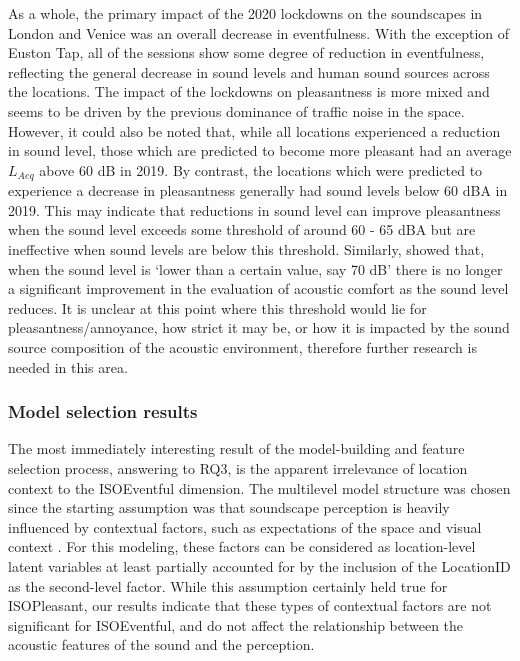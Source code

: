\documentclass[
  authoryear,
  preprint,
  3p,
  onecolumn]{elsarticle}
\begin{document}
As a whole, the primary impact of the 2020 lockdowns on the soundscapes
in London and Venice was an overall decrease in eventfulness. With the
exception of Euston Tap, all of the sessions show some degree of
reduction in eventfulness, reflecting the general decrease in sound
levels and human sound sources across the locations. The impact of the
lockdowns on pleasantness is more mixed and seems to be driven by the
previous dominance of traffic noise in the space. However, it could also
be noted that, while all locations experienced a reduction in sound
level, those which are predicted to become more pleasant had an average
\(L_{Aeq}\) above 60 dB in 2019. By contrast, the locations which were
predicted to experience a decrease in pleasantness generally had sound
levels below 60 dBA in 2019. This may indicate that reductions in sound
level can improve pleasantness when the sound level exceeds some
threshold of around 60 - 65 dBA but are ineffective when sound levels
are below this threshold. Similarly, \citet{Yang2005Acoustic} showed
that, when the sound level is `lower than a certain value, say 70 dB'
there is no longer a significant improvement in the evaluation of
acoustic comfort as the sound level reduces. It is unclear at this point
where this threshold would lie for pleasantness/annoyance, how strict it
may be, or how it is impacted by the sound source composition of the
acoustic environment, therefore further research is needed in this area.

\subsubsection{Model selection results}\label{model-selection-results}

The most immediately interesting result of the model-building and
feature selection process, answering to RQ3, is the apparent irrelevance
of location context to the ISOEventful dimension. The multilevel model
structure was chosen since the starting assumption was that soundscape
perception is heavily influenced by contextual factors, such as
expectations of the space and visual context \citep{Ricciardi2015Sound}.
For this modeling, these factors can be considered as location-level
latent variables at least partially accounted for by the inclusion of
the LocationID as the second-level factor. While this assumption
certainly held true for ISOPleasant, our results indicate that these
types of contextual factors are not significant for ISOEventful, and do
not affect the relationship between the acoustic features of the sound
and the perception.
\end{document}
